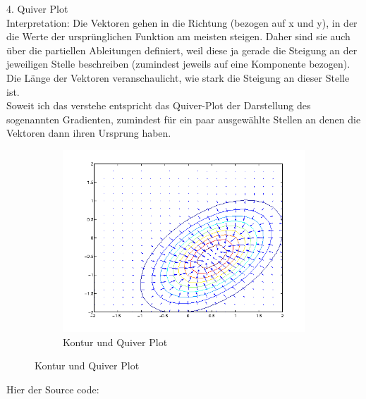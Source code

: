 \documentclass{article}
\begin{document}
	 	4. Quiver Plot\\
	 	Interpretation: Die Vektoren gehen in die Richtung (bezogen auf x und y), in der die Werte der ursprünglichen Funktion am meisten steigen. Daher sind sie auch über die partiellen Ableitungen definiert, weil diese ja gerade die Steigung an der jeweiligen Stelle beschreiben (zumindest jeweils auf eine Komponente bezogen).\\
	 	Die Länge der Vektoren veranschaulicht, wie stark die Steigung an dieser Stelle ist.\\
	 	Soweit ich das verstehe entspricht das Quiver-Plot der Darstellung des sogenannten Gradienten, zumindest für ein paar ausgewählte Stellen an denen die Vektoren dann ihren Ursprung haben.
		\begin{figure}[H]
		  \begin{subfigure}
		    \centering
		    \includegraphics[scale=0.5,bb=0 0 576 432]{task3-f2-quiver.png}
			\caption{Kontur und Quiver Plot}
		  \end{subfigure}
		\end{figure}
		
		Hier der Source code:
\end{document}
